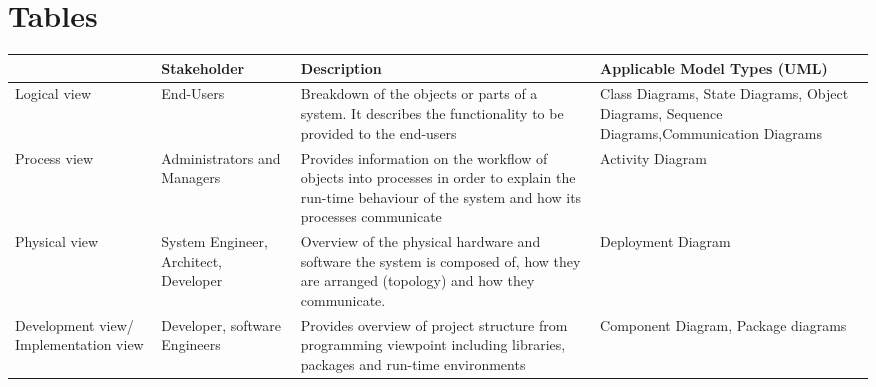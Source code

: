 \chapter{Tables}
\label{appendix:tables}

\begin{sidewaystable}[h]
\centering
\begin{tabularx}{\textwidth}{X X X X}
\hline
\rowcolor[HTML]{C0C0C0} 
\multicolumn{1}{|X|}{\cellcolor[HTML]{C0C0C0}\textbf{Viewpoint}} & \multicolumn{1}{X|}{\cellcolor[HTML]{C0C0C0}\textbf{Stakeholder}} & \multicolumn{1}{X|}{\cellcolor[HTML]{C0C0C0}\textbf{Description}}                                                                                                              & \multicolumn{1}{X|}{\cellcolor[HTML]{C0C0C0}\textbf{Applicable Model Types (UML)}}                             \\ \hline
\multicolumn{1}{|X|}{Logical view}                               & \multicolumn{1}{X|}{End-Users}                                    & \multicolumn{1}{X|}{Breakdown of the objects or parts of a system. It describes the functionality to be provided to the end-users}                                             & \multicolumn{1}{X|}{Class Diagrams, State Diagrams, Object Diagrams, Sequence Diagrams,Communication Diagrams} \\ \hline
\multicolumn{1}{|X|}{Process view}                               & \multicolumn{1}{X|}{Administrators and Managers}                  & \multicolumn{1}{X|}{Provides information on the workflow of objects into processes in order to explain the run-time behaviour of the system and how its processes communicate} & \multicolumn{1}{X|}{Activity Diagram}                                                                          \\ \hline
\multicolumn{1}{|X|}{Physical view}                              & \multicolumn{1}{X|}{System Engineer, Architect, Developer}        & \multicolumn{1}{X|}{Overview of the physical hardware and software the system is composed of, how they are arranged (topology) and how they communicate.}                      & \multicolumn{1}{X|}{Deployment Diagram}                                                                        \\ \hline
\multicolumn{1}{|X|}{Development view/ Implementation view}      & \multicolumn{1}{X|}{Developer, software Engineers}                & \multicolumn{1}{X|}{Provides overview of project structure from programming viewpoint including libraries, packages and run-time environments}                                 & \multicolumn{1}{X|}{Component Diagram, Package diagrams}                                                       \\ \hline

\end{tabularx}
\end{sidewaystable}
